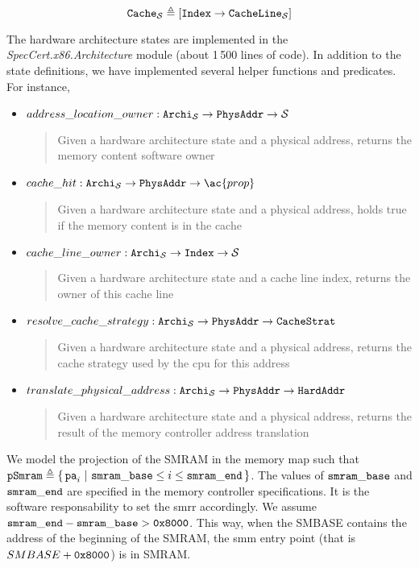 \[
  \texttt{Cache}_{\mathcal{S}} \triangleq [ \texttt{Index} \rightarrow
  \texttt{CacheLine}_{\mathcal{S}} ]
\]

The hardware architecture states are implemented in the
\emph{SpecCert.x86.Archi\-tecture} module (about 1\,500 lines of code).
%
In addition to the state definitions, we have implemented several helper
functions and predicates.
%
For instance,
%
\begin{itemize}
\item
  $address\_location\_owner : \texttt{Archi}_{\mathcal{S}} \rightarrow
  \texttt{PhysAddr} \rightarrow \mathcal{S}$
  \begin{quote}
    \small Given a hardware architecture state and a physical address, returns
    the memory content software owner
  \end{quote}
%
\item
  $cache\_hit : \texttt{Archi}_{\set{S}} \rightarrow \texttt{PhysAddr}
  \rightarrow \ac{prop}$
  \begin{quote}
    \small Given a hardware architecture state and a physical address, holds
    true if the memory content is in the cache
  \end{quote}
%
\item
  $cache\_line\_owner : \texttt{Archi}_{\mathcal{S}} \rightarrow \texttt{Index}
  \rightarrow \mathcal{S}$
  \begin{quote}
    \small Given a hardware architecture state and a cache line index, returns
    the owner of this cache line
  \end{quote}
%
\item
  $resolve\_cache\_strategy : \texttt{Archi}_{\mathcal{S}} \rightarrow
  \texttt{PhysAddr} \rightarrow \texttt{CacheStrat}$
  \begin{quote}
    \small Given a hardware architecture state and a physical address, returns
    the cache strategy used by the \ac{cpu} for this address
  \end{quote}
%
\item
  $translate\_physical\_address : \texttt{Archi}_{\mathcal{S}} \rightarrow
  \texttt{PhysAddr} \rightarrow \texttt{HardAddr}$
  \begin{quote}
    \small Given a hardware architecture state and a physical address, returns
    the result of the memory controller address translation
  \end{quote}
\end{itemize}

We model the projection of the SMRAM in the memory map such that
$\texttt{pSmram} \triangleq \{\,\mathtt{pa}_i\ |\ \mathtt{smram\_base} \leq i \le
  \mathtt{smram\_end}\,\}$.
%
The values of $\mathtt{smram\_base}$ and $\mathtt{smram\_end}$ are specified in the
memory controller specifications.
%
It is the software responsability to set the \ac{smrr} accordingly.
%
We assume $\mathtt{smram\_end} - \mathtt{smram\_base} > \mathtt{0x8000}$.
%
This way, when the SMBASE contains the address of the beginning of the SMRAM,
the \ac{smm} entry point (that is $SMBASE + \mathtt{0x8000}$) is in SMRAM.

